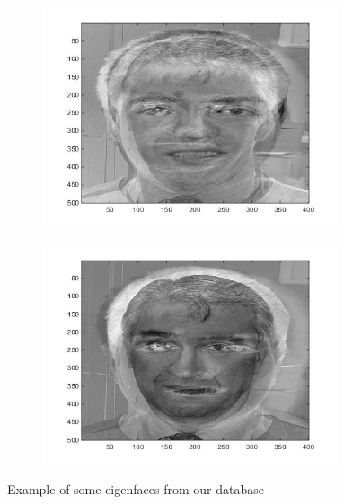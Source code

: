 \begin{figure}[H]
\begin{subfigure}{.24\textwidth}
  \caption{}
\end{subfigure}%
\begin{subfigure}{.24\textwidth}
  \centering
  \includegraphics[width=0.95\textwidth]{img/fr/eigenface3.jpg}
  \caption{}
\end{subfigure}%

\begin{subfigure}{.24\textwidth}
  \centering
  \includegraphics[width=0.95\textwidth]{img/fr/eigenface4.jpg}
  \caption{}
\end{subfigure}%

\caption{Example of some eigenfaces from our database}
\label{fig:eigenface}
\end{figure}
